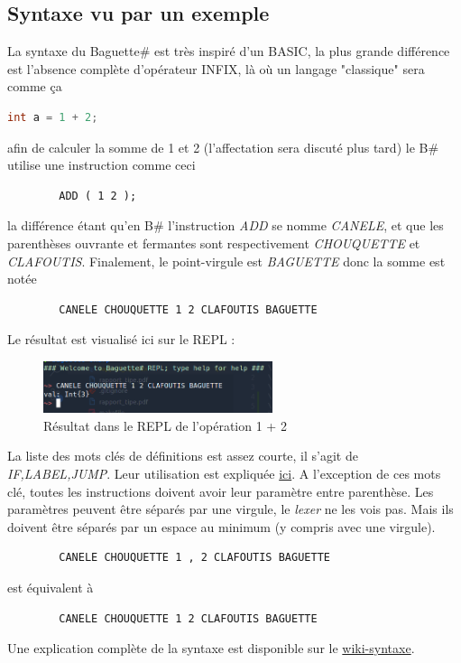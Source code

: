 \documentclass[11pt,colorlinks=true,a4paper]{article}
\newcommand{\bsf}{Baguette\# }
\newcommand{\bs}{B\# }
\begin{document}
    \subsection{Syntaxe vu par un exemple}
    \label{Exemple}
    La syntaxe du \bsf est très inspiré d'un BASIC, la plus grande différence est l'absence complète d'opérateur INFIX,
    là où un langage "classique" sera comme ça
    \begin{lstlisting}[language=Java]
        int a = 1 + 2;
    \end{lstlisting}
    afin de calculer la somme de 1 et 2 (l'affectation sera discuté plus tard) le \bs utilise une instruction comme ceci 
    \begin{lstlisting}
        ADD ( 1 2 );
    \end{lstlisting}
    la différence étant qu'en \bs l'instruction \textit{ADD} se nomme \textit{CANELE}, et que les parenthèses ouvrante et fermantes 
    sont respectivement \textit{CHOUQUETTE} et \textit{CLAFOUTIS}. Finalement, le point-virgule est \textit{BAGUETTE} donc la somme est
    notée 
    \begin{lstlisting}
        CANELE CHOUQUETTE 1 2 CLAFOUTIS BAGUETTE
    \end{lstlisting}
    Le résultat est visualisé ici sur le REPL :
    \begin{figure}[H]
        \center
        \includegraphics[width=0.6\textwidth]{img/add.png}
        \caption{Résultat dans le REPL de l'opération 1 + 2}
    \end{figure}
    
    La liste des mots clés de définitions est assez courte, il s'agit de \textit{IF,LABEL,JUMP}. Leur utilisation est expliquée \href{https://www.baguettesharp.fr/advanced.html#labels}{ici}.
    A l'exception de ces mots clé, toutes les instructions doivent avoir leur paramètre entre parenthèse. Les paramètres peuvent 
    être séparés par une virgule, le \textit{lexer} ne les vois pas. Mais ils doivent être séparés par un espace au minimum (y compris avec une virgule).
    \begin{lstlisting}
        CANELE CHOUQUETTE 1 , 2 CLAFOUTIS BAGUETTE
    \end{lstlisting}
    est équivalent à 
    \begin{lstlisting}
        CANELE CHOUQUETTE 1 2 CLAFOUTIS BAGUETTE
    \end{lstlisting}
    Une explication complète de la syntaxe est disponible sur le \href{https://github.com/coco33920/ocaml-baguettesharp-interpreter/wiki/The-basics#syntax}{wiki-syntaxe}.
\end{document}
